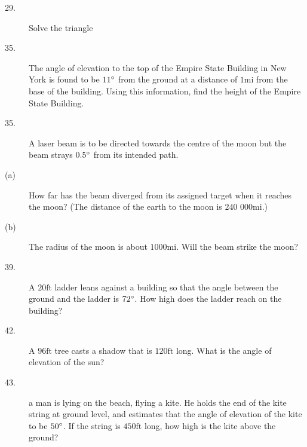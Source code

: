\begin{description}
\item [29.]   Solve the triangle 
\columnsep =30pt
 

\item [35.]
The angle of elevation to the top of the Empire State Building in New York is found to be $11 \mbox{{\ensuremath{{}^\circ}}}$ from the ground at a distance of $1 \mbox{mi}$ from the base of the building. Using this information,
find the height of the Empire State Building. 

\item [35.]
A laser beam is to be directed towards the centre of the moon but the beam strays $0.5 \mbox{{\ensuremath{{}^\circ}}}$ from its intended path. 

\item [(a)]
How far has the beam diverged from its assigned target when it reaches the moon? (The distance of the earth
to the moon is $240$ $000 \mbox{mi}\text{.}$) 

\item [(b)] The radius
of the moon is about $1000 \mbox{mi}$. Will the beam strike the moon? 

\item [39.]
A $20 \mbox{ft}$ ladder leans against a building so that the angle between the ground and the ladder is $72 \mbox{{\ensuremath{{}^\circ}}}$. How high does the ladder reach on the building?


\item [42.] A $96 \mbox{ft}$ tree casts a shadow that is $120 \mbox{ft}$ long. What is the angle of elevation of the sun?


\item [43.] a man is lying on the beach, flying a kite. He
holds the end of the kite string at ground level, and estimates that the angle of elevation of the kite to be $50 \mbox{{\ensuremath{{}^\circ}}}$. If the string is $450 \mbox{ft}$ long, how high is the kite above the ground? 


\end{description}
